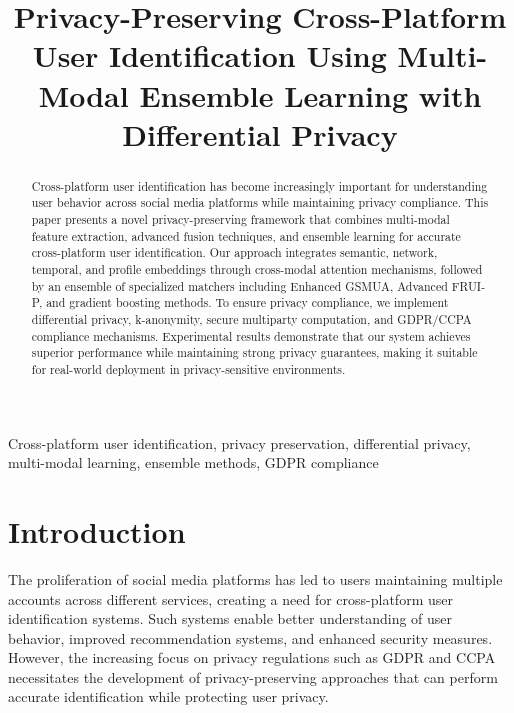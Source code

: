 \documentclass[conference]{IEEEtran}
\begin{document}
\title{Privacy-Preserving Cross-Platform User Identification Using Multi-Modal Ensemble Learning with Differential Privacy}

\author{
}

\maketitle

\begin{abstract}
Cross-platform user identification has become increasingly important for understanding user behavior across social media platforms while maintaining privacy compliance. This paper presents a novel privacy-preserving framework that combines multi-modal feature extraction, advanced fusion techniques, and ensemble learning for accurate cross-platform user identification. Our approach integrates semantic, network, temporal, and profile embeddings through cross-modal attention mechanisms, followed by an ensemble of specialized matchers including Enhanced GSMUA, Advanced FRUI-P, and gradient boosting methods. To ensure privacy compliance, we implement differential privacy, k-anonymity, secure multiparty computation, and GDPR/CCPA compliance mechanisms. Experimental results demonstrate that our system achieves superior performance while maintaining strong privacy guarantees, making it suitable for real-world deployment in privacy-sensitive environments.
\end{abstract}

\begin{IEEEkeywords}
Cross-platform user identification, privacy preservation, differential privacy, multi-modal learning, ensemble methods, GDPR compliance
\end{IEEEkeywords}

\section{Introduction}

The proliferation of social media platforms has led to users maintaining multiple accounts across different services, creating a need for cross-platform user identification systems. Such systems enable better understanding of user behavior, improved recommendation systems, and enhanced security measures. However, the increasing focus on privacy regulations such as GDPR and CCPA necessitates the development of privacy-preserving approaches that can perform accurate identification while protecting user privacy.
\end{document}

